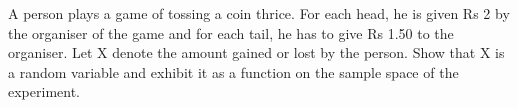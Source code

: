 \begin{flushleft}
A person plays a game of tossing a coin thrice. For each head, he is given Rs 2 by the organiser of the game and for each tail, he has to give Rs 1.50 to the organiser. Let
X denote the amount gained or lost by the person. Show that X is a random variable and
exhibit it as a function on the sample space of the experiment.
\end{flushleft}
